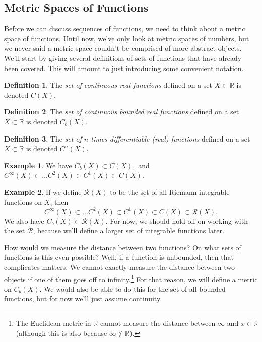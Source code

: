 \documentclass{article}
\newcommand{\R}{\mathbb{R}}
\theoremstyle{definition}
\newtheorem{definition}{Definition}[section]
\newtheorem{example}{Example}[section]
\begin{document}
	\subsection{Metric Spaces of Functions}
	Before we can discuss sequences of functions, we need to think about a metric space of functions. Until now, we've only look at metric spaces of numbers, but we never said a metric space couldn't be comprised of more abstract objects. We'll start by giving several definitions of sets of functions that have already been covered. This will amount to just introducing some convenient notation.
	\begin{definition}\label{def}
		The \textit{\color{red}set of continuous real functions} defined on a set $ X\subset\R $ is denoted $ C(X)$. 
	\end{definition}
	\begin{definition}\label{def}
		The \textit{\color{red}set of continuous bounded real functions} defined on a set $ X\subset\R $ is denoted $ C_b(X)$. 
	\end{definition}
	\begin{definition}\label{def}
		The \textit{\color{red}set of $ n $-times differentiable (real) functions} defined on a set $ X\subset\R $ is denoted $ C^n(X) $. 
	\end{definition}
	\begin{example}
		We have $ C_b(X)\subset C(X),$ and $C^\infty(X)\subset\ldots C^2(X)\subset C^1(X)\subset C(X) .$
	\end{example}
	\begin{example}
		If we define $ \mathscr{R}(X) $ to be the set of all Riemann integrable functions on $ X $, then $$C^\infty(X)\subset\ldots C^2(X)\subset C^1(X)\subset C(X)\subset\mathscr{R}(X) .$$ We also have $ C_b(X)\subset\mathscr{R}(X) $. For now, we should hold off on working with the set $ \mathscr{R} $, because we'll define a larger set of integrable functions later. 
	\end{example}
	How would we measure the distance between two functions? On what sets of functions is this even possible? Well, if a function is unbounded, then that complicates matters. We cannot exactly measure the distance between two objects if one of them goes off to infinity.\footnote{The Euclidean metric in $ \R $ cannot measure the distance between $ \infty $ and $ x\in\R $ (although this is also because $ \infty\notin\R $). } For that reason, we will define a metric on $ C_b(X) $. We would also be able to do this for the set of all bounded functions, but for now we'll just assume continuity. 
	
\end{document}
